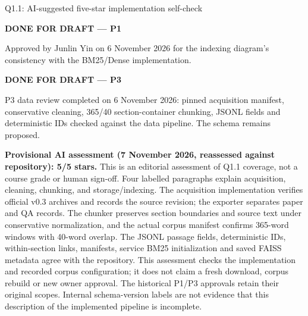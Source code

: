 \begin{review}{Q1.1: AI-suggested five-star implementation self-check}
\colorbox{yellow!45}{\strut\textbf{DONE FOR DRAFT --- P1}}\par
Approved by Junlin Yin on 6 November 2026 for the indexing diagram's consistency with the BM25/Dense implementation.\par\smallskip
\colorbox{yellow!45}{\strut\textbf{DONE FOR DRAFT --- P3}}\par
P3 data review completed on 6 November 2026: pinned acquisition manifest, conservative cleaning, 365/40 section-container chunking, JSONL fields and deterministic IDs checked against the data pipeline. The schema remains proposed.\par\smallskip
{}\quad\textbf{Provisional AI assessment (7 November 2026, reassessed against repository): 5/5 stars.} This is an editorial assessment of Q1.1 coverage, not a course grade or human sign-off. Four labelled paragraphs explain acquisition, cleaning, chunking, and storage/indexing. The acquisition implementation verifies official v0.3 archives and records the source revision; the exporter separates paper and QA records. The chunker preserves section boundaries and source text under conservative normalization, and the actual corpus manifest confirms 365-word windows with 40-word overlap. The JSONL passage fields, deterministic IDs, within-section links, manifests, service BM25 initialization and saved FAISS metadata agree with the repository. This assessment checks the implementation and recorded corpus configuration; it does not claim a fresh download, corpus rebuild or new owner approval. The historical P1/P3 approvals retain their original scopes. Internal schema-version labels are not evidence that this description of the implemented pipeline is incomplete.
\end{review}
